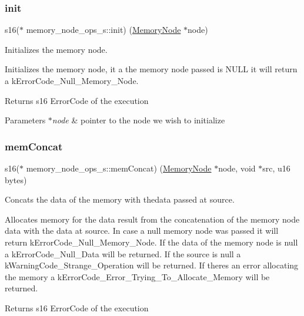\subsubsection{\texorpdfstring{init}{init}}
{\footnotesize\ttfamily s16($\ast$ memory\+\_\+node\+\_\+ops\+\_\+s\+::init) (\hyperlink{structmemory__node__s}{Memory\+Node} $\ast$node)}



Initializes the memory node. 

Initializes the memory node, it a the memory node passed is N\+U\+LL it will return a k\+Error\+Code\+\_\+\+Null\+\_\+\+Memory\+\_\+\+Node.

\begin{DoxyReturn}{Returns}
s16 Error\+Code of the execution 
\end{DoxyReturn}

\begin{DoxyParams}{Parameters}
{\em $\ast$node} & pointer to the node we wish to initialize \\
\hline
\end{DoxyParams}
\mbox{\label{structmemory__node__ops__s_a6cadae4d06b8349242302acc28c2df52}} 
\subsubsection{\texorpdfstring{mem\+Concat}{memConcat}}
{\footnotesize\ttfamily s16($\ast$ memory\+\_\+node\+\_\+ops\+\_\+s\+::mem\+Concat) (\hyperlink{structmemory__node__s}{Memory\+Node} $\ast$node, void $\ast$src, u16 bytes)}



Concats the data of the memory with thedata passed at source. 

Allocates memory for the data result from the concatenation of the memory node data with the data at source. In case a null memory node was passed it will return k\+Error\+Code\+\_\+\+Null\+\_\+\+Memory\+\_\+\+Node. If the data of the memory node is null a k\+Error\+Code\+\_\+\+Null\+\_\+\+Data will be returned. If the source is null a k\+Warning\+Code\+\_\+\+Strange\+\_\+\+Operation will be returned. If there\textquotesingle{}s an error allocating the memory a k\+Error\+Code\+\_\+\+Error\+\_\+\+Trying\+\_\+\+To\+\_\+\+Allocate\+\_\+\+Memory will be returned. \begin{DoxyReturn}{Returns}
s16 Error\+Code of the execution 
\end{DoxyReturn}

